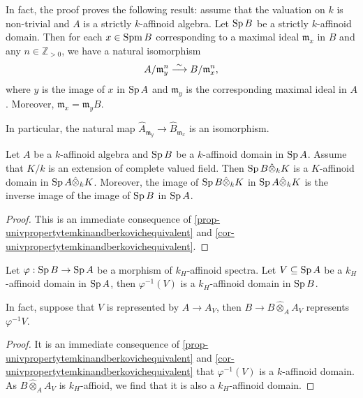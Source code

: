 \begin{remark}\label{rmk-affdomainresidue}
    In fact, the proof proves the following result: assume that the valuation on $k$ is non-trivial and $A$ is a strictly $k$-affinoid algebra. Let $\Sp B$ be a strictly $k$-affinoid domain. Then for each $x\in \operatorname{Spm} B$ corresponding to a maximal ideal $\mathfrak{m}_x$ in $B$ and any $n\in \mathbb{Z}_{>0}$, we have a natural isomorphism
    \[
        A/\mathfrak{m}_y^n  \stackrel{\sim}{\longrightarrow} B/\mathfrak{m}_x^n,
    \]
    where $y$ is the image of $x$ in $\Sp A$ and $\mathfrak{m}_y$ is the corresponding maximal ideal in $A$. Moreover, $\mathfrak{m}_x=\mathfrak{m}_y B$. 
    
    In particular, the natural map $\hat{A}_{\mathfrak{m}_y}\rightarrow \hat{B}_{\mathfrak{m}_x}$ is an isomorphism.
\end{remark}

\begin{corollary}\label{cor-affdomainfieldext}
    Let $A$ be a $k$-affinoid algebra and $\Sp B$ be a $k$-affinoid domain in $\Sp A$. Assume that $K/k$ is an extension of complete valued field. Then $\operatorname{Sp} B\hat{\otimes}_k K$ is a $K$-affinoid domain in $\operatorname{Sp} A\hat{\otimes}_k K$. Moreover, the image of  $\operatorname{Sp} B\hat{\otimes}_k K$ in $\operatorname{Sp} A\hat{\otimes}_k K$ is the inverse image of the image of $\Sp B$ in $\Sp A$.
\end{corollary}
\begin{proof}
    This is an immediate consequence of \cref{prop-univpropertytemkinandberkovichequivalent} and \cref{cor-univpropertytemkinandberkovichequivalent}.
\end{proof}

\begin{corollary}\label{cor-fiberproductaffdomain}
    Let $\varphi:\operatorname{Sp} B\rightarrow \operatorname{Sp} A$ be a morphism of $k_H$-affinoid spectra. Let $V\subseteq \operatorname{Sp} A$ be a $k_H$-affinoid domain in $\Sp A$, then $\varphi^{-1}(V)$ is a $k_H$-affinoid domain in $\Sp B$.

    In fact, suppose that $V$ is represented by $A\rightarrow A_V$, then $B\rightarrow B\hat{\otimes}_A A_V$ represents $\varphi^{-1}V$.
\end{corollary}
\begin{proof}
    It is an immediate consequence of \cref{prop-univpropertytemkinandberkovichequivalent} and \cref{cor-univpropertytemkinandberkovichequivalent} that $\varphi^{-1}(V)$ is a $k$-affinoid domain. As $B\hat{\otimes}_A A_V$ is $k_H$-affioid, we find that it is also a $k_H$-affinoid domain.
    \iffalse
    Recall that $\Sp B\hat{\otimes}_A A_V$ is the fiber product of $\Sp B$ and $\Sp A_V$ over $\Sp A$:
    \[
        \begin{tikzcd}
            \Sp B\hat{\otimes}_A A_V \arrow[r] \arrow[d] \arrow[rd, "\square", phantom] & \Sp B \arrow[d, "\varphi"] \\
            \Sp A_V \arrow[r]                                                           & \Sp A                     
        \end{tikzcd}.
    \]
    \fi
\end{proof}

